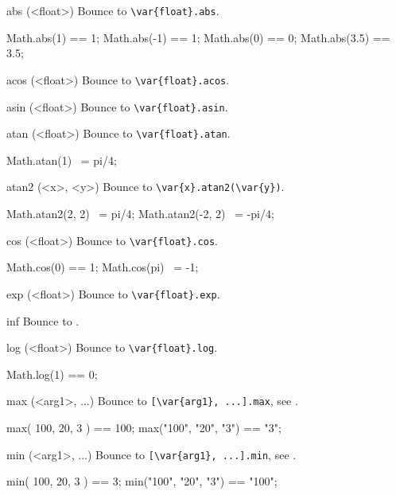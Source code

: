 \begin{urbiscriptapi}
\item[abs](<float>)%
  Bounce to \lstinline|\var{float}.abs|.
\begin{urbiassert}
Math.abs(1) == 1;
Math.abs(-1) == 1;
Math.abs(0) == 0;
Math.abs(3.5) == 3.5;
\end{urbiassert}
\item[acos](<float>)%
  Bounce to \lstinline|\var{float}.acos|.

\item[asin](<float>)%
  Bounce to \lstinline|\var{float}.asin|.

\item[atan](<float>)%
  Bounce to \lstinline|\var{float}.atan|.
\begin{urbiassert}
Math.atan(1) ~= pi/4;
\end{urbiassert}

\item[atan2](<x>, <y>)%
  Bounce to \lstinline|\var{x}.atan2(\var{y})|.
\begin{urbiassert}
Math.atan2(2, 2) ~= pi/4;
Math.atan2(-2, 2) ~= -pi/4;
\end{urbiassert}

\item[cos](<float>)%
  Bounce to \lstinline|\var{float}.cos|.
\begin{urbiassert}
Math.cos(0) == 1;
Math.cos(pi) ~= -1;
\end{urbiassert}

\item[exp](<float>)%
  Bounce to \lstinline|\var{float}.exp|.

\item[inf]
  Bounce to .

\item[log](<float>)%
  Bounce to \lstinline|\var{float}.log|.
\begin{urbiassert}
Math.log(1) == 0;
\end{urbiassert}

\item[max](<arg1>, ...)%
  Bounce to \lstinline|[\var{arg1}, ...].max|, see .
\begin{urbiassert}
max( 100,   20,   3 ) == 100;
max("100", "20", "3") == "3";
\end{urbiassert}

\item[min](<arg1>, ...)%
  Bounce to \lstinline|[\var{arg1}, ...].min|, see .
\begin{urbiassert}
min( 100,   20,   3 ) ==     3;
min("100", "20", "3") == "100";
\end{urbiassert}


\end{urbiscriptapi}
